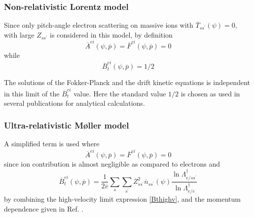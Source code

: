 \subsubsection{Non-relativistic Lorentz model}

Since only pitch-angle electron scattering on massive ions with $\overline{T}%
_{ss^{\prime }}\left( \psi \right) =0,$ with large $Z_{ss^{\prime }}$ is
considered in this model, by definition
\begin{equation}
\overline{A}^{ei}\left( \psi ,\overline{p}\right) =\overline{F}^{ei}\left(
\psi ,\overline{p}\right) =0
\end{equation}
while
\begin{equation}
\overline{B}_{t}^{ei}\left( \psi ,\overline{p}\right) =1/2
\end{equation}

The solutions of the Fokker-Planck and the drift kinetic equations is
independent in this limit of the $\overline{B}_{t}^{ei}$ value. Here the
standard value $1/2$ is chosen as used in several publications for
analytical calculations.

\subsubsection{Ultra-relativistic M\o ller model}

A simplified term is used where
\begin{equation}
\overline{A}^{ei}\left( \psi ,\overline{p}\right) =\overline{F}^{ei}\left(
\psi ,\overline{p}\right) =0
\end{equation}
since ion contribution is almost negligible as compared to electrons and
\begin{equation}
\overline{B}_{t}^{ei}\left( \psi ,\overline{p}\right) =\frac{1}{2\overline{v}%
}\sum_{s}\sum_{s^{\prime }}Z_{ss^{\prime }}^{2}\overline{n}_{ss^{\prime
}}\left( \psi \right) \frac{\ln \Lambda _{e/ss^{\prime }}^{\dagger }}{\ln
\Lambda _{e/e}^{\dagger }}
\end{equation}
by combining the high-velocity limit expression \ref{Bthighv}, and the
momentum dependence given in Ref. \cite{mol32}.
